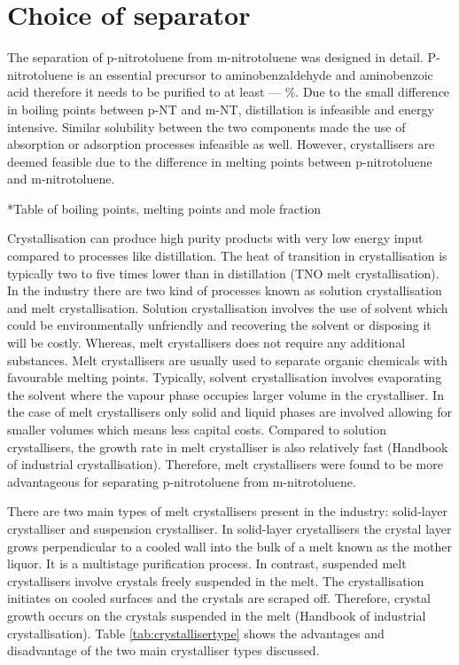\section{Choice of separator}
The separation of p-nitrotoluene from m-nitrotoluene was designed in detail. P-nitrotoluene is an essential precursor to aminobenzaldehyde and aminobenzoic acid therefore it needs to be purified to at least --- \%. Due to the small difference in boiling points between p-NT and m-NT, distillation is infeasible and energy intensive. Similar solubility between the two components made the use of absorption or adsorption processes infeasible as well. However, crystallisers are deemed feasible due to the difference in melting points between p-nitrotoluene and m-nitrotoluene.

*Table of boiling points, melting points and mole fraction 

Crystallisation can produce high purity products with very low energy input compared to processes like distillation. The heat of transition in crystallisation is typically two to five times lower than in distillation (TNO melt crystallisation). In the industry there are two kind of processes known as solution crystallisation and melt crystallisation. Solution crystallisation involves the use of solvent which could be environmentally unfriendly and recovering the solvent or disposing it will be costly. Whereas, melt crystallisers does not require any additional substances. Melt crystallisers are usually used to separate organic chemicals with favourable melting points. Typically, solvent crystallisation involves evaporating the solvent where the vapour phase occupies larger volume in the crystalliser. In the case of melt crystallisers only solid and liquid phases are involved allowing for smaller volumes which means less capital costs. Compared to solution crystallisers, the growth rate in melt crystalliser is also relatively fast (Handbook of industrial crystallisation). Therefore, melt crystallisers were found to be more advantageous for separating p-nitrotoluene from m-nitrotoluene. 

There are two main types of melt crystallisers present in the industry: solid-layer crystalliser and suspension crystalliser. In solid-layer crystallisers the crystal layer grows perpendicular to a cooled wall into the bulk of a melt known as the mother liquor. It is a multistage purification process. In contrast, suspended melt crystallisers involve crystals freely suspended in the melt. The crystallisation initiates on cooled surfaces and the crystals are scraped off. Therefore, crystal growth occurs on the crystals suspended in the melt (Handbook of industrial crystallisation). Table \ref{tab:crystallisertype} shows the advantages and disadvantage of the two main crystalliser types discussed. 

